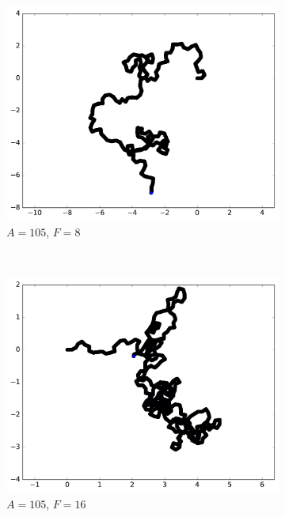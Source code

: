\begin{figure}[htb]
		~
		\begin{subfigure}[t]{\subImgWmo}
			\centering
			\includegraphics[width=\textwidth]{figures/ch3/synTraj_219_105_8}
			\caption[$A = 105$, $F=8$]{$A = 105$, $F=8$}
			\label{fig:synTraj_219_105_8}
		\end{subfigure}
		~
		\begin{subfigure}[t]{\subImgWmo}
			\centering
			\includegraphics[width=\textwidth]{figures/ch3/synTraj_219_105_16}
			\caption[$A = 105$, $F=16$]{$A = 105$, $F=16$}
			\label{fig:synTraj_219_105_16}
		\end{subfigure}
		~
		\begin{subfigure}[t]{\subImgWmo}

\end{subfigure}
\end{figure}
